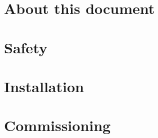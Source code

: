 \documentclass[]{article}
\begin{document}
\section{About this document}
\blindtext[1]	
\hypertarget{about_this_document}{}%
\section{Safety}
\hypertarget{safety}{}%
\blindtext[10]
\section{Installation}
\hypertarget{installation}{}
\blindtext[10]
\section{Commissioning}
\hypertarget{commissioning}{}	
\blindtext[5]	
\end{document}
